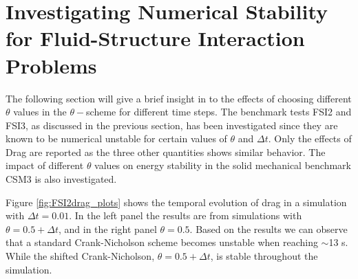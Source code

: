 \section{Investigating Numerical Stability for Fluid-Structure Interaction Problems}
The following section will give a brief insight in to the effects of choosing different $\theta$ values in the $\theta-$scheme for different time steps. 
The benchmark tests FSI2 and FSI3, as discussed in the previous section, has been investigated since they are known to be numerical unstable for certain values of $\theta$ and $\Delta t$. Only the effects of Drag are reported as the three other quantities shows similar behavior. 
The impact of different $\theta$ values on energy stability in the solid mechanical benchmark CSM3 is also investigated. 

Figure \ref{fig:FSI2drag_plots} shows the temporal evolution of drag in a simulation with $\Delta t = 0.01$. In the left panel the results are from simulations with $\theta = 0.5 + \Delta t$, and in the right panel $\theta = 0.5$. Based on the results we can observe that a standard Crank-Nicholson scheme becomes unstable when reaching $\sim$13 s. While the shifted Crank-Nicholson,  $\theta = 0.5 + \Delta t$, is stable throughout the simulation.

